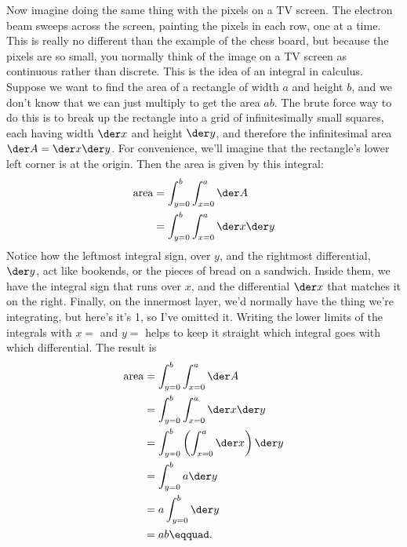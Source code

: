 Now imagine doing the same thing with the pixels on a TV screen. The electron
beam sweeps across the screen, painting the pixels in each row, one at a time.
This is really no different than the example of the chess board, but because the
pixels are so small, you normally think of the image on a TV screen as continuous
rather than discrete.
This is the idea of an integral in calculus.
Suppose we want to find the area of a rectangle of width
$a$ and height $b$, and we don't know that we can just multiply to get the
area $ab$. The brute force way to do this is to break up the rectangle into
a grid of infinitesimally small squares, each having width $\der x$ and
height $\der y$, and therefore the infinitesimal area $\der A = \der x \der y$.
For convenience, we'll imagine that the rectangle's
lower left corner is at the origin. Then the area is given by this integral:
\begin{align*}
  \text{area} &= \int_{y=0}^b \int_{x=0}^a \der A \\
              &= \int_{y=0}^b \int_{x=0}^a \der x \der y 
\end{align*}
Notice how the leftmost integral sign, over $y$, and the rightmost differential, $\der y$,
act like bookends, or the pieces of bread on a sandwich. Inside them, we have
the integral sign that runs over $x$, and the differential $\der x$ that matches
it on the right. Finally, on the innermost layer, we'd normally
have the thing we're integrating, but here's it's 1, so I've omitted it. Writing the
lower limits of the integrals with $x=$ and $y=$ helps to keep it straight which
integral goes with which differential. The result is
\begin{align*}
  \text{area} &= \int_{y=0}^b \int_{x=0}^a \der A \\
              &= \int_{y=0}^b \int_{x=0}^a \der x \der y \\
              &= \int_{y=0}^b \left(\int_{x=0}^a \der x\right) \der y \\
              &= \int_{y=0}^b a \der y \\
              &= a \int_{y=0}^b \der y \\
              &= ab\eqquad.
\end{align*}

